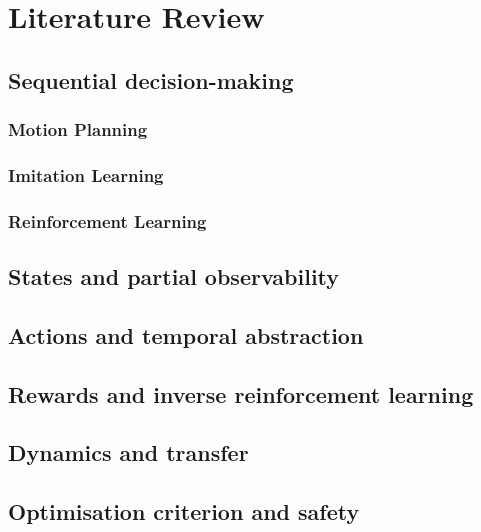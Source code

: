 
\chapter{Literature Review}
\label{chapter:2}

\section{Sequential decision-making}
\subsection{Motion Planning}
\subsection{Imitation Learning}
\subsection{Reinforcement Learning}
\section{States and partial observability}
\section{Actions and temporal abstraction}
\section{Rewards and inverse reinforcement learning}
\section{Dynamics and transfer}
\section{Optimisation criterion and safety}
